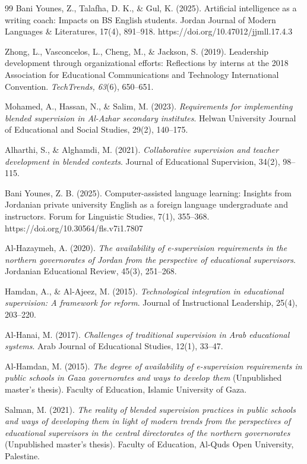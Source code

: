 \documentclass[10pt]{NSP1}
\begin{document}
\begin{thebibliography}{99}
 Bani Younes, Z., Talafha, D. K., \& Gul, K. (2025). Artificial intelligence as a writing coach: Impacts on BS English students. Jordan Journal of Modern Languages \& Literatures, 17(4), 891--918. https://doi.org/10.47012/jjmll.17.4.3

 Zhong, L., Vasconcelos, L., Cheng, M., \& Jackson, S. (2019). Leadership development through organizational efforts: Reflections by interns at the 2018 Association for Educational Communications and Technology International Convention. \emph{TechTrends, 63}(6), 650--651.

 Mohamed, A., Hassan, N., \& Salim, M. (2023). \emph{Requirements for implementing blended supervision in Al-Azhar secondary institutes}. Helwan University Journal of Educational and Social Studies, 29(2), 140--175.

 Alharthi, S., \& Alghamdi, M. (2021). \emph{Collaborative supervision and teacher development in blended contexts}. Journal of Educational Supervision, 34(2), 98--115.

 Bani Younes, Z. B. (2025). Computer-assisted language learning: Insights from Jordanian private university English as a foreign language undergraduate and instructors. Forum for Linguistic Studies, 7(1), 355--368. https://doi.org/10.30564/fls.v7i1.7807

 Al-Hazaymeh, A. (2020). \emph{The availability of e-supervision requirements in the northern governorates of Jordan from the perspective of educational supervisors}. Jordanian Educational Review, 45(3), 251--268.

 Hamdan, A., \& Al-Ajeez, M. (2015). \emph{Technological integration in educational supervision: A framework for reform}. Journal of Instructional Leadership, 25(4), 203--220.

 Al-Hanai, M. (2017). \emph{Challenges of traditional supervision in Arab educational systems}. Arab Journal of Educational Studies, 12(1), 33--47.

 Al-Hamdan, M. (2015). \emph{The degree of availability of e-supervision requirements in public schools in Gaza governorates and ways to develop them} (Unpublished master's thesis). Faculty of Education, Islamic University of Gaza.

 Salman, M. (2021). \emph{The reality of blended supervision practices in public schools and ways of developing them in light of modern trends from the perspectives of educational supervisors in the central directorates of the northern governorates} (Unpublished master's thesis). Faculty of Education, Al-Quds Open University, Palestine.


\end{thebibliography}
\end{document}
